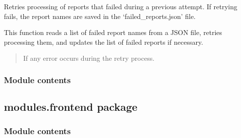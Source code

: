 \documentclass[letterpaper,10pt,english]{sphinxmanual}
\begin{document}

\begin{fulllineitems}
\label{\detokenize{modules.data_storage:modules.data_storage.retry_failed_reports.retry_failed_reports}}
\pysigstartsignatures
\pysiglinewithargsret
{}
{}
{}
\pysigstopsignatures
\sphinxAtStartPar
Retries processing of reports that failed during a previous attempt.
If retrying fails, the report names are saved in the ‘failed\_reports.json’ file.

\sphinxAtStartPar
This function reads a list of failed report names from a JSON file, retries
processing them, and updates the list of failed reports if necessary.
\begin{quote}\begin{description}
\sphinxAtStartPar
{} \textendash{} If any error occurs during the retry process.

\end{description}\end{quote}

\end{fulllineitems}



\subsubsection{Module contents}
\label{\detokenize{modules.data_storage:module-modules.data_storage}}\label{\detokenize{modules.data_storage:module-contents}}
\sphinxstepscope


\subsection{modules.frontend package}
\label{\detokenize{modules.frontend:modules-frontend-package}}\label{\detokenize{modules.frontend::doc}}

\subsubsection{Module contents}
\label{\detokenize{modules.frontend:module-modules.frontend}}\label{\detokenize{modules.frontend:module-contents}}
\sphinxstepscope
\end{document}
